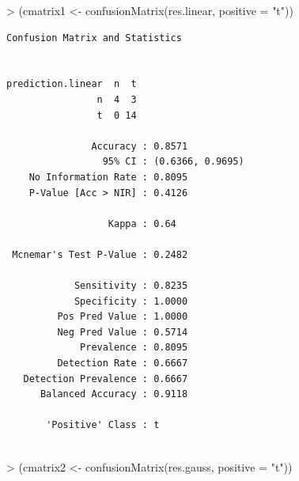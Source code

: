\documentclass[
]{article}
\newenvironment{Shaded}{\begin{snugshade}}{\end{snugshade}}
\newcommand{\AttributeTok}[1]{\textcolor[rgb]{0.80,0.80,0.80}{#1}}
\newcommand{\FunctionTok}[1]{\textcolor[rgb]{0.94,0.94,0.56}{#1}}
\newcommand{\NormalTok}[1]{\textcolor[rgb]{0.80,0.80,0.80}{#1}}
\newcommand{\OtherTok}[1]{\textcolor[rgb]{0.94,0.94,0.56}{#1}}
\newcommand{\SpecialCharTok}[1]{\textcolor[rgb]{0.86,0.64,0.64}{#1}}
\newcommand{\StringTok}[1]{\textcolor[rgb]{0.80,0.58,0.58}{#1}}
\begin{document}
\begin{Shaded}
\begin{Highlighting}[]
\SpecialCharTok{\textgreater{}}\NormalTok{ (cmatrix1 }\OtherTok{\textless{}{-}} \FunctionTok{confusionMatrix}\NormalTok{(res.linear, }\AttributeTok{positive =} \StringTok{"t"}\NormalTok{))}
\end{Highlighting}
\end{Shaded}

\begin{verbatim}
Confusion Matrix and Statistics

                 
prediction.linear  n  t
                n  4  3
                t  0 14
                                          
               Accuracy : 0.8571          
                 95% CI : (0.6366, 0.9695)
    No Information Rate : 0.8095          
    P-Value [Acc > NIR] : 0.4126          
                                          
                  Kappa : 0.64            
                                          
 Mcnemar's Test P-Value : 0.2482          
                                          
            Sensitivity : 0.8235          
            Specificity : 1.0000          
         Pos Pred Value : 1.0000          
         Neg Pred Value : 0.5714          
             Prevalence : 0.8095          
         Detection Rate : 0.6667          
   Detection Prevalence : 0.6667          
      Balanced Accuracy : 0.9118          
                                          
       'Positive' Class : t               
                                          
\end{verbatim}

\begin{Shaded}
\begin{Highlighting}[]
\SpecialCharTok{\textgreater{}}\NormalTok{ (cmatrix2 }\OtherTok{\textless{}{-}} \FunctionTok{confusionMatrix}\NormalTok{(res.gauss, }\AttributeTok{positive =} \StringTok{"t"}\NormalTok{))}
\end{Highlighting}
\end{Shaded}
\end{document}
